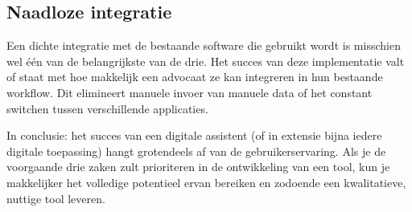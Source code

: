 \subsection{Naadloze integratie}
Een dichte integratie met de bestaande software die gebruikt wordt is misschien wel één van de belangrijkste van de drie. Het succes van deze implementatie valt of staat met hoe makkelijk 
een advocaat ze kan integreren in hun bestaande workflow. Dit elimineert manuele invoer van manuele data of het constant switchen tussen verschillende applicaties. 

In conclusie: het succes van een digitale assistent (of in extensie bijna iedere digitale toepassing) hangt grotendeels af van de gebruikerservaring. 
Als je de voorgaande drie zaken zult prioriteren in de ontwikkeling van een tool, kun je makkelijker het volledige potentieel ervan bereiken en zodoende een kwalitatieve, nuttige tool leveren. 
